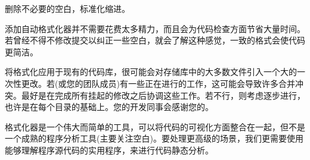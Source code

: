 删除不必要的空白，标准化缩进。

添加自动格式化器并不需要花费太多精力，而且会为代码检查方面节省大量时间。若曾经不得不修改提交以纠正一些空白，就会了解这种感觉，一致的格式会使代码更简洁。

\begin{tcolorbox}[colback=blue!5!white,colframe=blue!75!black,title=Note]
将格式化应用于现有的代码库，很可能会对存储库中的大多数文件引入一个大的一次性更改。若(或您的团队成员)有一些正在进行的工作，这可能会导致许多合并冲突。最好是在完成所有挂起的修改之后协调这些工作。若不行，则考虑逐步进行，也许是在每个目录的基础上。您的开发同事会感谢您的。
\end{tcolorbox}

格式化器是一个伟大而简单的工具，可以将代码的可视化方面整合在一起，但不是一个成熟的程序分析工具(主要关注空白)。要处理更高级的场景，我们更需要使用能够理解程序源代码的实用程序，来进行代码静态分析。
